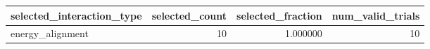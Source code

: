 \begin{tabular}{lrrr}
\toprule
selected_interaction_type & selected_count & selected_fraction & num_valid_trials \\
\midrule
energy_alignment & 10 & 1.000000 & 10 \\
\bottomrule
\end{tabular}
